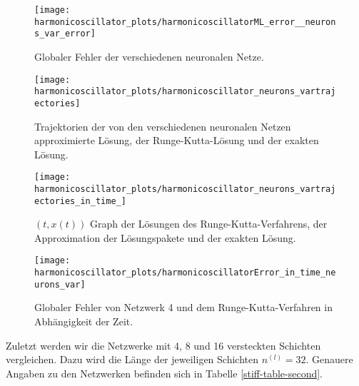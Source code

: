 \begin{figure}
       \centering
       \texttt{[image: harmonicoscillator\_plots/harmonicoscillatorML\_error\_\_neurons\_var\_error]}
       \caption{Globaler Fehler der verschiedenen neuronalen Netze.}
       \label{fig:harmonic-neurons-variable-error}
\end{figure}
\begin{figure}
       \centering
       \texttt{[image: harmonicoscillator\_plots/harmonicoscillator\_neurons\_vartrajectories]}
       \caption{Trajektorien der von den verschiedenen neuronalen Netzen approximierte Lösung, der Runge-Kutta-Lösung
       und der exakten Lösung.}
       \label{fig:harmonic-neurons-variable-trajectories}
\end{figure}
\begin{figure}
       \centering
       \texttt{[image: harmonicoscillator\_plots/harmonicoscillator\_neurons\_vartrajectories\_in\_time\_]}
       \caption{$(t,x(t))$ Graph der Lösungen des Runge-Kutta-Verfahrens, der Approximation der
       Lösungspakete und der exakten Lösung.}
       \label{fig:harmonic-neurons-variable-trajectories-in-time}
\end{figure}
\begin{figure}
       \centering
       \texttt{[image: harmonicoscillator\_plots/harmonicoscillatorError\_in\_time\_neurons\_var]}
       \caption{Globaler Fehler von Netzwerk 4 und dem Runge-Kutta-Verfahren in Abhängigkeit der Zeit.}
       \label{fig:harmonic-neurons-variable-error-in-time}
\end{figure}
Zuletzt werden wir die Netzwerke mit 4, 8 und 16 versteckten Schichten vergleichen. Dazu wird die Länge der jeweiligen
Schichten $n^{(l)}=32$. Genauere Angaben zu den Netzwerken befinden sich in Tabelle \ref{stiff-table-second}.
